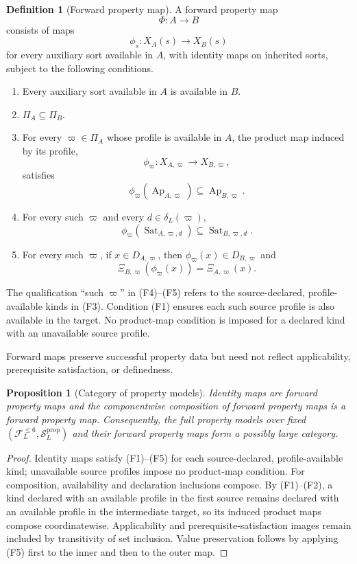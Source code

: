 \documentclass[11pt]{article}
\newcommand{\FVI}{\mathcal F_{L}^{\le 6}}
\newcommand{\Sprop}{\mathcal S_{L}^{\mathrm{prop}}}
\newcommand{\Ap}{\operatorname{Ap}}
\newcommand{\Sat}{\operatorname{Sat}}
\newtheorem{proposition}[theorem]{Proposition}
\theoremstyle{definition}
\newtheorem{definition}[theorem]{Definition}
\theoremstyle{remark}
\begin{document}
\begin{definition}[Forward property map]
\label{def:forward-map}
A forward property map
\[
\Phi:A\longrightarrow B
\]
consists of maps
\[
\phi_s:X_A(s)\longrightarrow X_B(s)
\]
for every auxiliary sort available in \(A\), with identity maps on inherited sorts, subject to the following conditions.
\begin{enumerate}[label=(F\arabic*)]
\item Every auxiliary sort available in \(A\) is available in \(B\).
\item \(\Pi_A\subseteq\Pi_B\).
\item For every \(\varpi\in\Pi_A\) whose profile is available in \(A\), the product map induced by its profile,
\[
\phi_{\varpi}:X_{A,\varpi}\longrightarrow X_{B,\varpi},
\]
satisfies
\[
\phi_{\varpi}(\Ap_{A,\varpi})\subseteq\Ap_{B,\varpi}.
\]
\item For every such \(\varpi\) and every \(d\in\delta_L(\varpi)\),
\[
\phi_{\varpi}(\Sat_{A,\varpi,d})\subseteq\Sat_{B,\varpi,d}.
\]
\item For every such \(\varpi\), if \(x\in D_{A,\varpi}\), then \(\phi_{\varpi}(x)\in D_{B,\varpi}\) and
\[
\Xi_{B,\varpi}(\phi_{\varpi}(x))=\Xi_{A,\varpi}(x).
\]
\end{enumerate}
The qualification ``such \(\varpi\)'' in (F4)--(F5) refers to the source-declared, profile-available kinds in (F3).
Condition (F1) ensures each such source profile is also available in the target.
No product-map condition is imposed for a declared kind with an unavailable source profile.
\end{definition}

Forward maps preserve successful property data but need not reflect applicability, prerequisite satisfaction, or definedness.

\begin{proposition}[Category of property models]
Identity maps are forward property maps and the componentwise composition of forward property maps is a forward property map.
Consequently, the full property models over fixed \((\FVI,\Sprop)\) and their forward property maps form a possibly large category.
\end{proposition}

\begin{proof}
Identity maps satisfy (F1)--(F5) for each source-declared, profile-available kind; unavailable source profiles impose no product-map condition.
For composition, availability and declaration inclusions compose.
By (F1)--(F2), a kind declared with an available profile in the first source remains declared with an available profile in the intermediate target, so its induced product maps compose coordinatewise.
Applicability and prerequisite-satisfaction images remain included by transitivity of set inclusion.
Value preservation follows by applying (F5) first to the inner and then to the outer map.
\end{proof}
\end{document}
